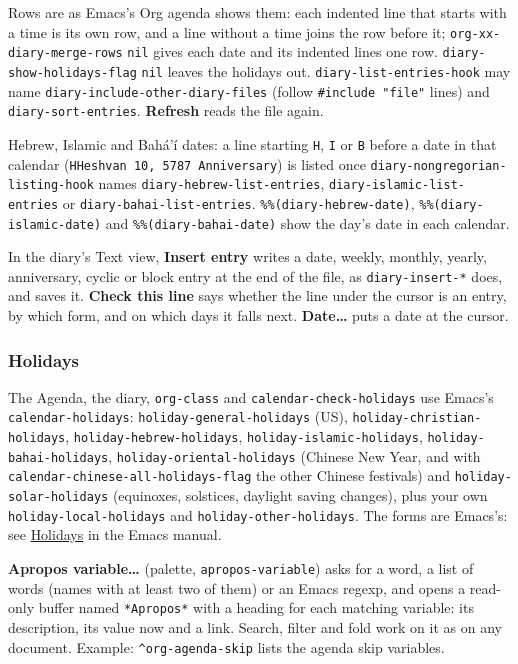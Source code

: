 \documentclass[11pt]{article}
\begin{document}
Rows are as Emacs's Org agenda shows them: each indented line that starts with a time is its own row, and a line without a time joins the row before it; \texttt{org-xx-diary-merge-rows} \texttt{nil} gives each date and its indented lines one row. \texttt{diary-show-holidays-flag} \texttt{nil} leaves the holidays out. \texttt{diary-list-entries-hook} may name \texttt{diary-include-other-diary-files} (follow \texttt{\#include "file"} lines) and \texttt{diary-sort-entries}. \textbf{Refresh} reads the file again.

Hebrew, Islamic and Bahá'í dates: a line starting \texttt{H}, \texttt{I} or \texttt{B} before a date in that calendar (\texttt{HHeshvan 10, 5787 Anniversary}) is listed once \texttt{diary-nongregorian-listing-hook} names \texttt{diary-hebrew-list-entries}, \texttt{diary-islamic-list-entries} or \texttt{diary-bahai-list-entries}. \texttt{\%\%(diary-hebrew-date)}, \texttt{\%\%(diary-islamic-date)} and \texttt{\%\%(diary-bahai-date)} show the day's date in each calendar.

In the diary's Text view, \textbf{Insert entry} writes a date, weekly, monthly, yearly, anniversary, cyclic or block entry at the end of the file, as \texttt{diary-insert-*} does, and saves it. \textbf{Check this line} says whether the line under the cursor is an entry, by which form, and on which days it falls next. \textbf{Date…} puts a date at the cursor.

\subsubsection{Holidays}
\label{sec:orgf9fd27a}
The Agenda, the diary, \texttt{org-class} and \texttt{calendar-check-holidays} use Emacs's \texttt{calendar-holidays}: \texttt{holiday-general-holidays} (US), \texttt{holiday-christian-holidays}, \texttt{holiday-hebrew-holidays}, \texttt{holiday-islamic-holidays}, \texttt{holiday-bahai-holidays}, \texttt{holiday-oriental-holidays} (Chinese New Year, and with \texttt{calendar-chinese-all-holidays-flag} the other Chinese festivals) and \texttt{holiday-solar-holidays} (equinoxes, solstices, daylight saving changes), plus your own \texttt{holiday-local-holidays} and \texttt{holiday-other-holidays}. The forms are Emacs's: see \href{https://www.gnu.org/software/emacs/manual/html\_node/emacs/Holidays.html}{Holidays} in the Emacs manual.

\textbf{Apropos variable…} (palette, \texttt{apropos-variable}) asks for a word, a list of words (names with at least two of them) or an Emacs regexp, and opens a read-only buffer named \texttt{*Apropos*} with a heading for each matching variable: its description, its value now and a link. Search, filter and fold work on it as on any document. Example: \texttt{\textasciicircum{}org-agenda-skip} lists the agenda skip variables.
\end{document}
